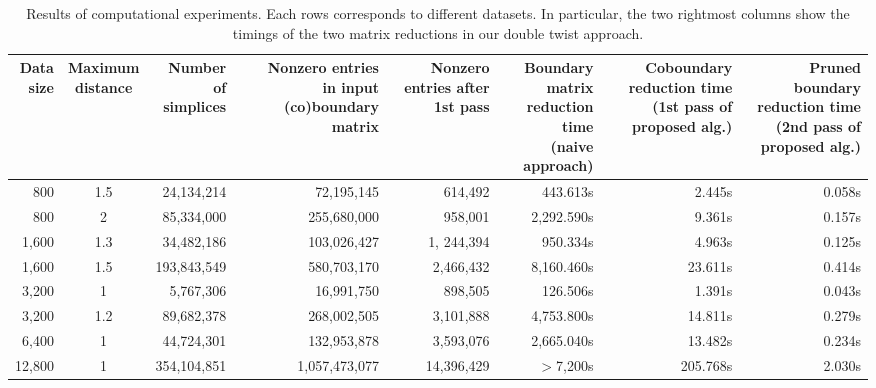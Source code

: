 \begin{table*}[t!]{
\caption{Results of computational experiments. Each rows corresponds to different datasets. In particular, the two rightmost columns show the timings of the two matrix reductions in our double twist approach.}
\label{tab:results}
\resizebox{0.95\textwidth}{!}
{
\begin{tabular}{|r|c|r|r|r|r||r|r|}
\hline
\thead{Data\\size} & \thead{Maximum\\distance} & \thead{Number of\\simplices} & \thead{Nonzero entries \\ in input (co)boundary matrix} & \thead{Nonzero entries after\\1st pass} & \thead{Boundary matrix \\ reduction  time \\ (naive approach)} & \thead{Coboundary\\reduction time \\ (1st pass of proposed alg.)} & \thead{Pruned boundary\\reduction time \\ (2nd pass of proposed alg.)}\\ \hline
800 & 1.5 & 24,134,214 & 72,195,145 & 614,492 & 443.613s & 2.445s & 0.058s \\ \hline
800 & 2 & 85,334,000 & 255,680,000 & 958,001 & 2,292.590s & 9.361s & 0.157s \\ \hline
1,600 & 1.3 & 34,482,186 & 103,026,427 & 1, 244,394 & 950.334s & 4.963s & 0.125s \\ \hline
1,600 & 1.5 & 193,843,549 & 580,703,170 & 2,466,432 & 8,160.460s & 23.611s & 0.414s \\ \hline
3,200 & 1 & 5,767,306 & 16,991,750 & 898,505 & 126.506s & 1.391s & 0.043s \\ \hline
3,200 & 1.2 & 89,682,378 & 268,002,505 & 3,101,888 & 4,753.800s & 14.811s & 0.279s \\ \hline
\hline
6,400 & 1 & 44,724,301 & 132,953,878 & 3,593,076 & 2,665.040s & 13.482s & 0.234s \\ \hline
12,800 & 1 & 354,104,851 & 1,057,473,077 & 14,396,429 & $>$7,200s & 205.768s & 2.030s \\ \hline
\end{tabular}
}
}
\end{table*}


